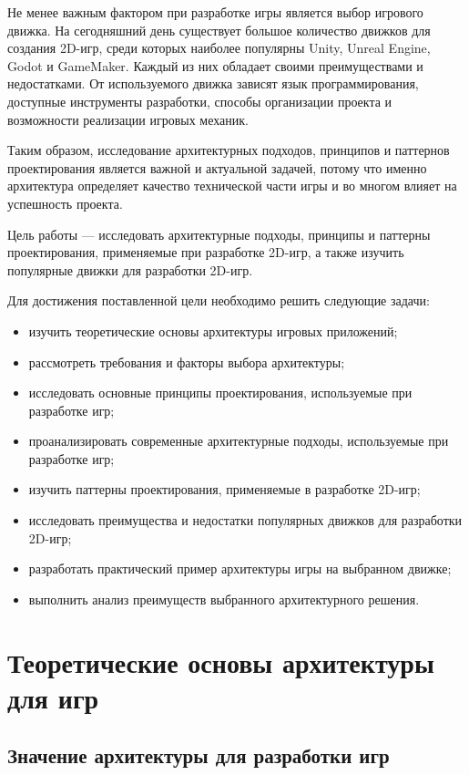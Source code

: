 \documentclass[a4paper,12pt]{report}
\begin{document}
Не менее важным фактором при разработке игры является выбор игрового движка. На сегодняшний день существует большое количество движков для создания 2D-игр, среди которых наиболее популярны Unity, Unreal Engine, Godot и GameMaker. Каждый из них обладает своими преимуществами и недостатками. От используемого движка зависят язык программирования, доступные инструменты разработки, способы организации проекта и возможности реализации игровых механик.

Таким образом, исследование архитектурных подходов, принципов и паттернов проектирования является важной и актуальной задачей, потому что именно архитектура определяет качество технической части игры и во многом влияет на успешность проекта.

Цель работы --- исследовать архитектурные подходы, принципы и паттерны проектирования, применяемые при разработке 2D-игр, а также изучить популярные движки для разработки 2D-игр.

Для достижения поставленной цели необходимо решить следующие задачи:

\begin{itemize}
    \item изучить теоретические основы архитектуры игровых приложений;
    \item рассмотреть требования и факторы выбора архитектуры;
    \item исследовать основные принципы проектирования, используемые при разработке игр;
    \item проанализировать современные архитектурные подходы, используемые при разработке игр;
    \item изучить паттерны проектирования, применяемые в разработке 2D-игр;
    \item исследовать преимущества и недостатки популярных движков для разработки 2D-игр;
    \item разработать практический пример архитектуры игры на выбранном движке;
    \item выполнить анализ преимуществ выбранного архитектурного решения.
\end{itemize}

\chapter{Теоретические основы архитектуры для игр}\label{chapter:theory}

\section{Значение архитектуры для разработки игр}
\end{document}
